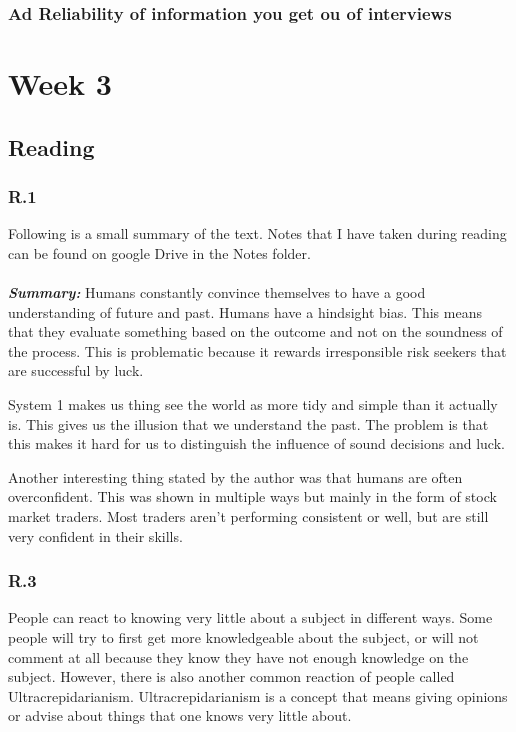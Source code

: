 \documentclass[]{article}
\begin{document}
\subsubsection*{Ad Reliability of information you get ou of interviews}

\section*{Week 3}

\subsection*{Reading} 

\subsubsection*{R.1} 
Following is a small summary of the text. Notes that I have taken during reading 
can be found on google Drive in the Notes folder.\\\\
\textbf{\textit{Summary:}} 
Humans constantly convince themselves to have a good understanding of future and 
past. Humans have a hindsight bias. This means that they evaluate something based 
on the outcome and not on the soundness of the process. This is problematic 
because it rewards irresponsible risk seekers that are successful by luck. 

System 1 makes us thing see the world as more tidy and simple than it actually is.
This gives us the illusion that we understand the past. The problem is that this 
makes it hard for us to distinguish the influence of sound decisions and luck.

Another interesting thing stated by the author was that humans are often overconfident.
This was shown in multiple ways but mainly in the form of stock market traders. 
Most traders aren't performing consistent or well, but are still very 
confident in their skills.

\subsubsection*{R.3}
People can react to knowing very little about a subject in different ways. Some 
people will try to first get more knowledgeable about the subject, or will 
not comment at all because they know they have not enough knowledge on the 
subject. However, there is also another common reaction of people called
Ultracrepidarianism. Ultracrepidarianism is a concept that means giving opinions 
or advise about things that one knows very little about. 
\end{document}
